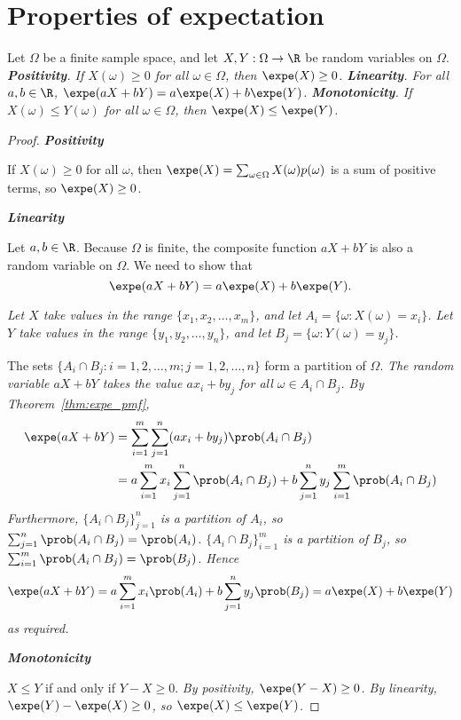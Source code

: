 \section{Properties of expectation}
\begin{theorem}\label{thm:prop_expe}
Let $\Omega$ be a finite sample space, and let $X,Y:\Omega\to\R$ be random variables on $\Omega$.
\ben
\it \textbf{Positivity}. 	If $X(\omega)\geq 0$ for all $\omega\in\Omega$, then $\expe(X)\geq 0$.
\it \textbf{Linearity}.		For all $a,b\in\R$, $\expe(aX+bY) = a\expe(X) + b\expe(Y)$.
\it \textbf{Monotonicity}.	If $X(\omega)\leq Y(\omega)$ for all $\omega\in\Omega$, then $\expe(X)\leq\expe(Y)$.
\een
\end{theorem}


\begin{proof}
\ben
\it %
\textbf{Positivity}\par
If $X(\omega)\geq 0$ for all $\omega$, then $\expe(X)=\sum_{\omega\in\Omega}X(\omega)p(\omega)$ is a sum of positive terms, so $\expe(X)\geq 0$.

\it %
\textbf{Linearity}\par
Let $a,b\in\R$. Because $\Omega$ is finite, the composite function $aX+bY$ is also a random variable on $\Omega$. We need to show that
\[
\expe(aX + bY)= a\expe(X)+b\expe(Y).
\]

\bit
\it Let $X$ take values in the range $\{x_1,x_2,\ldots,x_m\}$, and let $A_i = \{\omega: X(\omega)=x_i\}$.
\it Let $Y$ take values in the range $\{y_1,y_2,\ldots,y_n\}$, and let $B_j = \{\omega: Y(\omega)=y_j\}$.
\eit

The sets $\{A_i\cap B_j : i=1,2,\ldots,m ; j=1,2,\ldots,n\}$ form a partition of $\Omega$.
\bit
\it The random variable $aX + bY$ takes the value $ax_i + by_j$ for all $\omega\in A_i\cap B_j$.
\eit
By Theorem~\ref{thm:expe_pmf},
\begin{align*}
\expe(aX + bY) 
	& = \sum_{i=1}^{m}\sum_{j=1}^{n} (ax_i + by_j) \prob(A_i\cap B_j) \\
	& = a\sum_{i=1}^{m} x_i \sum_{j=1}^{n}\prob(A_i\cap B_j) + b\sum_{j=1}^{n} y_j \sum_{i=1}^{m} \prob(A_i\cap B_j) \\ 
\end{align*}
Furthermore,
\bit
\it $\{A_i\cap B_j\}_{j=1}^n$ is a partition of $A_i$, so $\sum_{j=1}^{n}\prob(A_i\cap B_j) = \prob(A_i)$.
\it $\{A_i\cap B_j\}_{i=1}^m$ is a partition of $B_j$, so $\sum_{i=1}^{m}\prob(A_i\cap B_j) = \prob(B_j)$.
\eit
Hence
\[
\expe(aX+bY) 
	= a\sum_{i=1}^{m} x_i\prob(A_i) + b\sum_{j=1}^{n} y_j\prob(B_j)
	= a\expe(X) + b\expe(Y)
\]
as required.

\it %
\textbf{Monotonicity}\par
$X\leq Y$ if and only if $Y-X\geq 0$. 
	\bit
	\it By positivity, $\expe(Y-X)\geq 0$.
	\it By linearity, $\expe(Y)-\expe(X)\geq 0$, so $\expe(X)\leq\expe(Y)$.
	\eit
\een
\end{proof}

